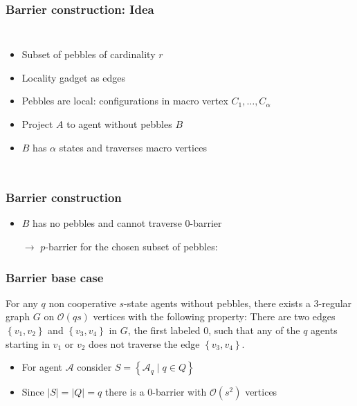 \documentclass{beamer}
\begin{document}
\begin{frame}
  \frametitle{Barrier construction: Idea}
  \begin{columns}
    \begin{itemize}
      \item Subset of pebbles of cardinality $r$
      \item Locality gadget as edges
      \item Pebbles are local: configurations in macro vertex
        $C_{1},\dots,C_{\alpha}$
      \item Project $A$ to agent without pebbles $B$
      \item $B$ has $\alpha$ states and traverses macro vertices
    \end{itemize}
    \resizebox{\textwidth}{!}{}
  \end{columns}
\end{frame}

\begin{frame}
  \frametitle{Barrier construction}
  \begin{itemize}
    \item $B$ has no pebbles and cannot traverse $0$-barrier
    \item[$\rightarrow$] $p$-barrier for the chosen subset of pebbles:
  \end{itemize}
  \begin{center}
    \resizebox{0.8\textwidth}{!}{}
  \end{center}
\end{frame}

\begin{frame}
  \frametitle{Barrier base case}
  \begin{theorem}[Fraigniaud et al.]
    For any $q$ non cooperative $s$-state agents without pebbles, there
    exists a 3-regular graph $G$ on $\mathcal{O}(qs)$ vertices with the
    following property: There are two edges $\left\{v_{1},v_{2}\right\}$
    and $\left\{v_{3},v_{4}\right\}$ in $G$, the first labeled 0, such
    that any of the $q$ agents starting in $v_{1}$ or $v_{2}$ does not
    traverse the edge $\left\{v_{3},v_{4}\right\}$.
  \end{theorem}
  \begin{itemize}
    \item For agent $\mathcal{A}$ consider
      $S = \left\{\mathcal{A}_{q}\mid q\in Q\right\}$
    \item Since $|S| = |Q| = q$ there is a 0-barrier with $\mathcal{O}(s^{2})$
      vertices
  \end{itemize}
\end{frame}
\end{document}
